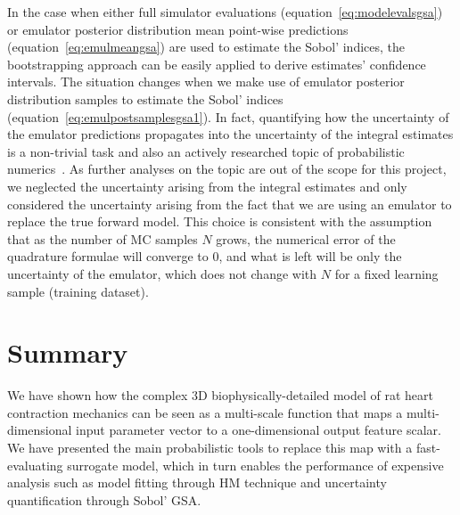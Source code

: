 \vspace{0.2cm}\noindent
In the case when either full simulator evaluations (equation~\eqref{eq:modelevalsgsa}) or emulator posterior distribution mean point-wise predictions (equation~\eqref{eq:emulmeangsa}) are used to estimate the Sobol' indices, the bootstrapping approach can be easily applied to derive estimates' confidence intervals. The situation changes when we make use of emulator posterior distribution samples to estimate the Sobol' indices (equation~\eqref{eq:emulpostsamplesgsa1}). In fact, quantifying how the uncertainty of the emulator predictions propagates into the uncertainty of the integral estimates is a non-trivial task and also an actively researched topic of probabilistic numerics~\cite{Hennig:2015,Oates:2017,Cockayne:2019,Fisher:2019}. As further analyses on the topic are out of the scope for this project, we neglected the uncertainty arising from the integral estimates and only considered the uncertainty arising from the fact that we are using an emulator to replace the true forward model. This choice is consistent with the assumption that as the number of MC samples $N$ grows, the numerical error of the quadrature formulae will converge to $0$, and what is left will be only the uncertainty of the emulator, which does not change with $N$ for a fixed learning sample (training dataset).


%
%
%
\section{Summary}\label{sec:ch3summary}
We have shown how the complex $3$D biophysically-detailed model of rat heart contraction mechanics can be seen as a multi-scale function that maps a multi-dimensional input parameter vector to a one-dimensional output feature scalar. We have presented the main probabilistic tools to replace this map with a fast-evaluating surrogate model, which in turn enables the performance of expensive analysis such as model fitting through HM technique and uncertainty quantification through Sobol' GSA.